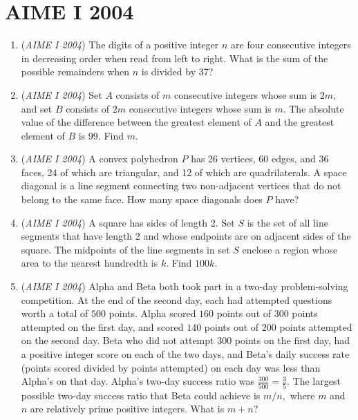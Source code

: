 \section{AIME I 2004}
        \begin{enumerate}
        	\item (\textit{AIME I 2004}) The digits of a positive integer $n$ are four consecutive integers in decreasing order when read from left to right. What is the sum of the possible remainders when $n$ is divided by 37?


 

	\item (\textit{AIME I 2004}) Set $A$ consists of $m$ consecutive integers whose sum is $2m,$ and set $B$ consists of $2m$ consecutive integers whose sum is $m.$ The absolute value of the difference between the greatest element of $A$ and the greatest element of $B$ is 99. Find $m.$


	\item (\textit{AIME I 2004}) A convex polyhedron $P$ has 26 vertices, 60 edges, and 36 faces, 24 of which are triangular, and 12 of which are quadrilaterals. A space diagonal is a line segment connecting two non-adjacent vertices that do not belong to the same face. How many space diagonals does $P$ have?


 

	\item (\textit{AIME I 2004}) A square has sides of length 2. Set $S$ is the set of all line segments that have length 2 and whose endpoints are on adjacent sides of the square. The midpoints of the line segments in set $S$ enclose a region whose area to the nearest hundredth is $k.$ Find $100k.$


	\item (\textit{AIME I 2004}) Alpha and Beta both took part in a two-day problem-solving competition. At the end of the second day, each had attempted questions worth a total of $500$ points. Alpha scored $160$ points out of $300$ points attempted on the first day, and scored $140$ points out of $200$ points attempted on the second day. Beta who did not attempt $300$ points on the first day, had a positive integer score on each of the two days, and Beta's daily success rate (points scored divided by points attempted) on each day was less than Alpha's on that day. Alpha's two-day success ratio was $\frac{300}{500} = \frac{3}{5}$. The largest possible two-day success ratio that Beta could achieve is $m/n,$ where $m$ and $n$ are relatively prime positive integers. What is $m+n$?



\end{enumerate}
